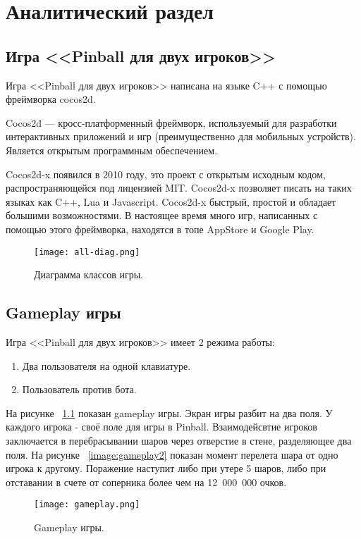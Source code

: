 \chapter{Аналитический раздел}

\section{Игра <<Pinball для двух игроков>>}
Игра <<Pinball для двух игроков>> написана на языке C++ с помощью фреймворка cocos2d.

Cocos2d — кросс-платформенный фреймворк, используемый для разработки интерактивных приложений и игр (преимущественно для мобильных устройств). Является открытым программным обеспечением. \cite{wiki-cocos}

Cocos2d-x появился в 2010 году, это проект с открытым исходным кодом, распространяющейся под лицензией MIT. Cocos2d-x позволяет писать на таких языках как C++, Lua и Javascript. Cocos2d-x быстрый, простой и обладает большими возможностями. В настоящее время много игр, написанных с помощью этого фреймворка, находятся в топе AppStore и Google Play. \cite{habrahabr-cocos}

\begin{figure}[h]
  \centering
  \texttt{[image: all-diag.png]}
  \caption{Диаграмма классов игры.}
\end{figure}

\section{Gameplay игры}

Игра <<Pinball для двух игроков>> имеет 2 режима работы:
\begin{enumerate}
\item Два пользователя на одной клавиатуре.
\item Пользователь против бота.
\end{enumerate}

На рисунке ~\ref{image:gameplay} показан gameplay игры. Экран игры разбит на два поля. У каждого игрока - своё поле для игры в Pinball. Взаимодейсвтие игроков заключается в перебрасывании шаров через отверстие в стене, разделяющее два поля. На рисунке ~\ref{image:gameplay2} показан момент перелета шара от одно игрока к другому. Поражение наступит либо при утере 5 шаров, либо при отставании в счете от соперника более чем на 12~000~000 очков.

\begin{figure}
  \centering
  \texttt{[image: gameplay.png]}
  \caption{Gameplay игры.}
  \label{image:gameplay}
\end{figure}


